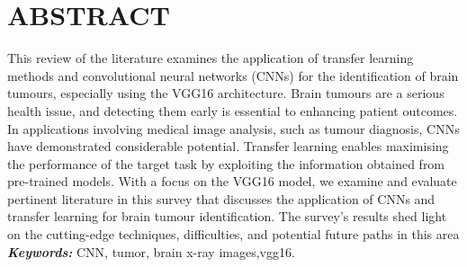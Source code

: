 \newpage
\section*{\Large\centering \textbf{ABSTRACT}}
This review of the literature examines the
application of transfer learning methods and convolutional neural
networks (CNNs) for the identification of brain tumours, especially using the VGG16 architecture. Brain tumours are a serious
health issue, and detecting them early is essential to enhancing patient outcomes. In applications involving medical image
analysis, such as tumour diagnosis, CNNs have demonstrated
considerable potential. Transfer learning enables maximising the
performance of the target task by exploiting the information
obtained from pre-trained models. With a focus on the VGG16
model, we examine and evaluate pertinent literature in this survey
that discusses the application of CNNs and transfer learning for
brain tumour identification. The survey’s results shed light on the
cutting-edge techniques, difficulties, and potential future paths in this area\\
\hfill \vspace{1cm} \break 
\small
\noindent \textbf{\textit{Keywords:}} CNN, tumor, brain x-ray images,vgg16.








\newpage